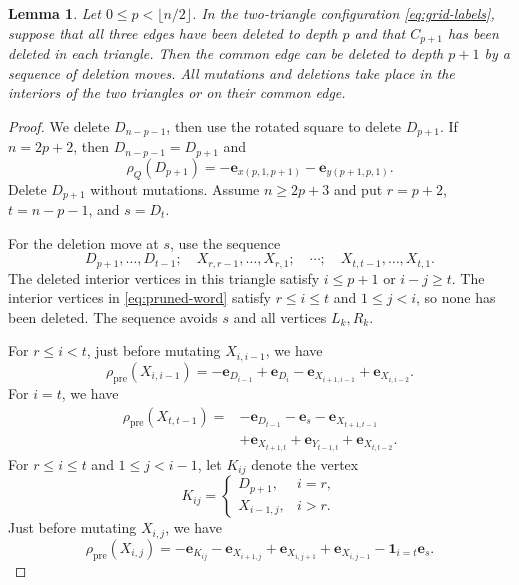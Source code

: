 \documentclass[12pt, letter]{amsart}
\newtheorem{lemma}[theorem]{Lemma}
\theoremstyle{definition}
\numberwithin{equation}{section}
\begin{document}
\begin{lemma}\label{lem:edge-layer}
Let $0\le p<\lfloor n/2\rfloor$.
In the two-triangle configuration \eqref{eq:grid-labels}, suppose that
all three edges have been deleted to depth $p$ and that $C_{p+1}$
has been deleted in each triangle.
Then the common edge can be deleted to depth $p+1$
by a sequence of deletion moves.
All mutations and deletions take place in the interiors of the two triangles
or on their common edge.
\end{lemma}
\begin{proof}
We delete $D_{n-p-1}$, then use the rotated square to delete $D_{p+1}$.
If $n=2p+2$, then $D_{n-p-1}=D_{p+1}$ and
\[
 \rho_Q(D_{p+1})=-\mathbf e_{x(p,1,p+1)}-\mathbf e_{y(p+1,p,1)}.
\]
Delete $D_{p+1}$ without mutations. Assume $n\ge2p+3$ and put
$r=p+2$, $t=n-p-1$, and $s=D_t$.

For the deletion move at $s$, use the sequence
\begin{equation}\label{eq:pruned-word}
 D_{p+1},\ldots,D_{t-1};\quad
 X_{r,r-1},\ldots,X_{r,1};\quad\cdots;\quad
 X_{t,t-1},\ldots,X_{t,1}.
\end{equation}
The deleted interior vertices in this triangle satisfy
$i\le p+1$ or $i-j\ge t$.
The interior vertices in \eqref{eq:pruned-word} satisfy $r\le i\le t$ and $1\le j<i$,
so none has been deleted. The sequence avoids $s$ and all vertices $L_k,R_k$.

For $r\le i<t$, just before mutating $X_{i,i-1}$, we have
\begin{equation}\label{eq:pruned-top}
 \rho_{\mathrm{pre}}(X_{i,i-1})
 =-\mathbf e_{D_{i-1}}+\mathbf e_{D_i}
  -\mathbf e_{X_{i+1,i-1}}+\mathbf e_{X_{i,i-2}}.
\end{equation}
For $i=t$, we have
\begin{equation}\label{eq:pruned-last}
 \begin{split}
 \rho_{\mathrm{pre}}(X_{t,t-1})={}&-\mathbf e_{D_{t-1}}-\mathbf e_s
                 -\mathbf e_{X_{t+1,t-1}}\\
              &+\mathbf e_{X_{t+1,t}}+\mathbf e_{Y_{t-1,t}}
                 +\mathbf e_{X_{t,t-2}}.
 \end{split}
\end{equation}
For $r\le i\le t$ and $1\le j<i-1$, let $K_{ij}$ denote the vertex
\[
 K_{ij}=\begin{cases}D_{p+1},&i=r,\\X_{i-1,j},&i>r.\end{cases}
\]
Just before mutating $X_{i,j}$, we have
\begin{equation}\label{eq:pruned-lower}
 \rho_{\mathrm{pre}}(X_{i,j})=-\mathbf e_{K_{ij}}
        -\mathbf e_{X_{i+1,j}}+\mathbf e_{X_{i,j+1}}
        +\mathbf e_{X_{i,j-1}}-\mathbf1_{i=t}\mathbf e_s.
\end{equation}
 

\end{proof}
\end{document}
